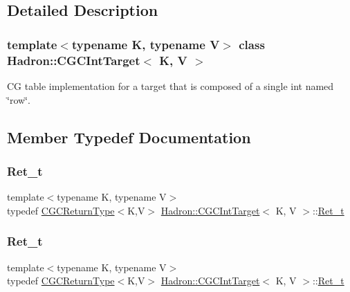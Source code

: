 \subsection{Detailed Description}
\subsubsection*{template$<$typename K, typename V$>$\newline
class Hadron\+::\+C\+G\+C\+Int\+Target$<$ K, V $>$}

CG table implementation for a target that is composed of a single int named \char`\"{}row\char`\"{}. 

\subsection{Member Typedef Documentation}
\mbox{\label{classHadron_1_1CGCIntTarget_a3436ab6591c4722808ea25ced7b18c46}} 
\subsubsection{\texorpdfstring{Ret\_t}{Ret\_t}\hspace{0.1cm}{\footnotesize\ttfamily [1/3]}}
{\footnotesize\ttfamily template$<$typename K, typename V$>$ \\
typedef \mbox{\hyperlink{structHadron_1_1CGCReturnType}{C\+G\+C\+Return\+Type}}$<$K,V$>$ \mbox{\hyperlink{classHadron_1_1CGCIntTarget}{Hadron\+::\+C\+G\+C\+Int\+Target}}$<$ K, V $>$\+::\mbox{\hyperlink{classHadron_1_1CGCIntTarget_a3436ab6591c4722808ea25ced7b18c46}{Ret\+\_\+t}}}

\mbox{\label{classHadron_1_1CGCIntTarget_a3436ab6591c4722808ea25ced7b18c46}} 
\subsubsection{\texorpdfstring{Ret\_t}{Ret\_t}\hspace{0.1cm}{\footnotesize\ttfamily [2/3]}}
{\footnotesize\ttfamily template$<$typename K, typename V$>$ \\
typedef \mbox{\hyperlink{structHadron_1_1CGCReturnType}{C\+G\+C\+Return\+Type}}$<$K,V$>$ \mbox{\hyperlink{classHadron_1_1CGCIntTarget}{Hadron\+::\+C\+G\+C\+Int\+Target}}$<$ K, V $>$\+::\mbox{\hyperlink{classHadron_1_1CGCIntTarget_a3436ab6591c4722808ea25ced7b18c46}{Ret\+\_\+t}}}

